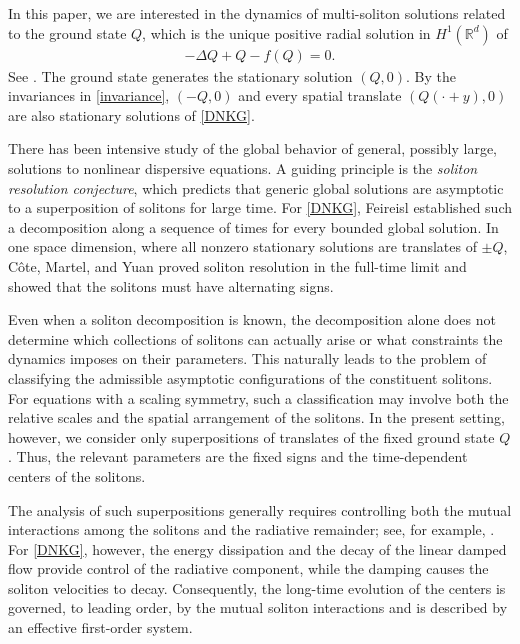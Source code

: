 \documentclass[reqno]{amsart}
\theoremstyle{plain}
\theoremstyle{definition}
\numberwithin{equation}{section}
\begin{document}
In this paper, we are interested in the dynamics of multi-soliton solutions related to the ground state $Q$, which is the unique positive radial solution in $H^1(\mathbb{R}^d)$ of
\begin{align}\label{Qode}
-\Delta Q+Q-f(Q)=0.
\end{align}
See \cite{K2}. The ground state generates the stationary solution $(Q,0)$. By the invariances in \eqref{invariance}, $(-Q,0)$ and every spatial translate $(Q(\cdot+y),0)$ are also stationary solutions of \eqref{DNKG}.

There has been intensive study of the global behavior of general, possibly large, solutions to nonlinear dispersive equations. A guiding principle is the \textit{soliton resolution conjecture}, which predicts that generic global solutions are asymptotic to a superposition of solitons for large time. For \eqref{DNKG}, Feireisl \cite{F} established such a decomposition along a sequence of times for every bounded global solution. In one space dimension, where all nonzero stationary solutions are translates of $\pm Q$, C\^{o}te, Martel, and Yuan \cite{CMY} proved soliton resolution in the full-time limit and showed that the solitons must have alternating signs.

Even when a soliton decomposition is known, the decomposition alone does not determine which collections of solitons can actually arise or what constraints the dynamics imposes on their parameters. This naturally leads to the problem of classifying the admissible asymptotic configurations of the constituent solitons. For equations with a scaling symmetry, such a classification may involve both the relative scales and the spatial arrangement of the solitons. In the present setting, however, we consider only superpositions of translates of the fixed ground state $Q$. Thus, the relevant parameters are the fixed signs and the time-dependent centers of the solitons. 


The analysis of such superpositions generally requires controlling both the mutual interactions among the solitons and the radiative remainder; see, for example, \cite{CJ,IN}. For \eqref{DNKG}, however, the energy dissipation and the decay of the linear damped flow provide control of the radiative component, while the damping causes the soliton velocities to decay. Consequently, the long-time evolution of the centers is governed, to leading order, by the mutual soliton interactions and is described by an effective first-order system.
\end{document}
